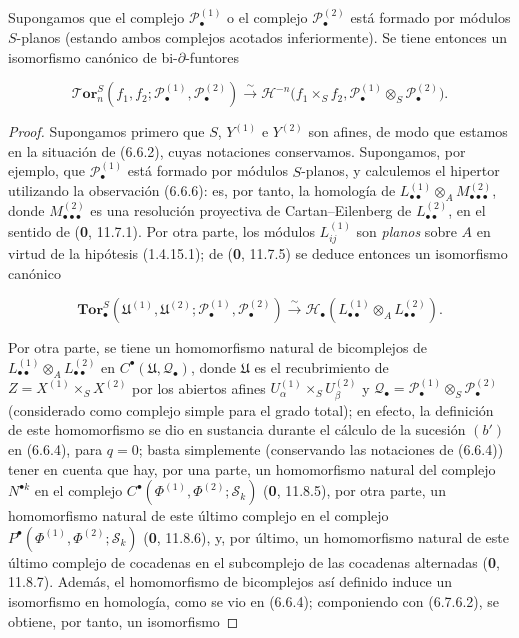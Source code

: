 \begin{proposition}[6.7.6]
\label{III.6.7.6}
Supongamos que el complejo $\mathscr P_\bullet^{(1)}$ o el complejo
$\mathscr P_\bullet^{(2)}$ está formado por módulos $S$-planos (estando ambos
complejos acotados inferiormente). Se tiene entonces un isomorfismo canónico
de bi-$\partial$-funtores

\label{III.6.7.6.1}
\[
  \boldsymbol{\mathscr{T}\!or}_n^S
  (f_1,f_2;\mathscr P_\bullet^{(1)},\mathscr P_\bullet^{(2)})
  \xrightarrow{\sim}
  \mathcal H^{-n}\bigl(f_1\times_S f_2,
    \mathscr P_\bullet^{(1)}\otimes_S\mathscr P_\bullet^{(2)}\bigr).
  \tag{6.7.6.1}\label{III.6.7.6.1.fr}
\]

\end{proposition}

\begin{proof}
Supongamos primero que $S$, $Y^{(1)}$ e $Y^{(2)}$ son afines, de modo que
estamos en la situación de (6.6.2), cuyas notaciones conservamos. Supongamos,
por ejemplo, que $\mathscr P_\bullet^{(1)}$ está formado por módulos
$S$-planos, y calculemos el hipertor utilizando la observación (6.6.6): es,
por tanto, la homología de
$L_{\bullet\bullet}^{(1)}\otimes_A M_{\bullet\bullet\bullet}^{(2)}$, donde
$M_{\bullet\bullet\bullet}^{(2)}$ es una resolución proyectiva de
Cartan--Eilenberg de $L_{\bullet\bullet}^{(2)}$, en el sentido de
(\textbf{0}, 11.7.1). Por otra parte, los módulos
$L_{ij}^{(1)}$ son \emph{planos} sobre $A$ en virtud de la hipótesis
(1.4.15.1); de (\textbf{0}, 11.7.5) se deduce entonces un isomorfismo
canónico

\label{III.6.7.6.2}
\[
  \mathbf{Tor}_\bullet^S
  (\mathfrak U^{(1)},\mathfrak U^{(2)};
   \mathscr P_\bullet^{(1)},\mathscr P_\bullet^{(2)})
  \xrightarrow{\sim}
  \mathscr H_\bullet
  (L_{\bullet\bullet}^{(1)}\otimes_A L_{\bullet\bullet}^{(2)}).
  \tag{6.7.6.2}\label{III.6.7.6.2.fr}
\]

Por otra parte, se tiene un homomorfismo natural de bicomplejos de
$L_{\bullet\bullet}^{(1)}\otimes_A L_{\bullet\bullet}^{(2)}$ en
$C^\bullet(\mathfrak U,\mathscr Q_\bullet)$, donde $\mathfrak U$ es el
recubrimiento de $Z=X^{(1)}\times_S X^{(2)}$ por los abiertos afines
$U_\alpha^{(1)}\times_S U_\beta^{(2)}$ y
$\mathscr Q_\bullet
=\mathscr P_\bullet^{(1)}\otimes_S\mathscr P_\bullet^{(2)}$ (considerado como
complejo simple para el grado total); en efecto, la definición de este
homomorfismo se dio en sustancia durante el cálculo de la sucesión $(b')$ en
(6.6.4), para $q=0$; basta simplemente (conservando las notaciones de (6.6.4))
tener en cuenta que hay, por una parte, un homomorfismo natural del complejo
$N^{\bullet k}$ en el complejo
$C^\bullet(\Phi^{(1)},\Phi^{(2)};\mathscr S_k)$
(\textbf{0}, 11.8.5), por otra parte, un homomorfismo natural de este
último complejo en el complejo
$P^\bullet(\Phi^{(1)},\Phi^{(2)};\mathscr S_k)$
(\textbf{0}, 11.8.6), y, por último, un homomorfismo natural de este
último complejo de cocadenas en el subcomplejo de las cocadenas alternadas
(\textbf{0}, 11.8.7). Además, el homomorfismo de bicomplejos así definido
induce un isomorfismo en homología, como se vio en (6.6.4); componiendo con
(6.7.6.2), se obtiene, por tanto, un isomorfismo


\end{proof}
